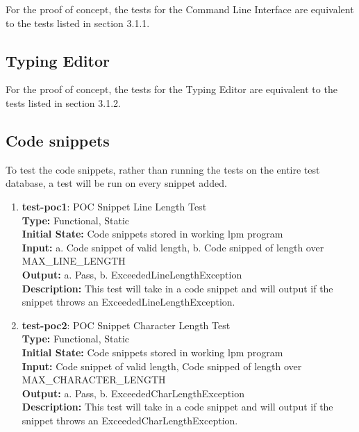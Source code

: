 \documentclass[12pt, titlepage]{article}
\begin{document}
For the proof of concept, the tests for the Command Line Interface are equivalent to the tests listed in section 3.1.1.

\subsection{Typing Editor}

For the proof of concept, the tests for the Typing Editor are equivalent to the tests listed in section 3.1.2.

\subsection{Code snippets}

To test the code snippets, rather than running the tests on the entire test database, a test will be run on every snippet added.

\begin{enumerate}

\item{\textbf{test-poc1}: POC Snippet Line Length Test\\}
\textbf{Type:} Functional, Static \\
\textbf{Initial State:} Code snippets stored in working lpm program\\
\textbf{Input:} a. Code snippet of valid length, b. Code snipped of length over MAX\_LINE\_LENGTH\\
\textbf{Output:} a. Pass, b. ExceededLineLengthException \\
\textbf{Description:} This test will take in a code snippet and will output if the snippet throws an ExceededLineLengthException.\\

\item{\textbf{test-poc2}: POC Snippet Character Length Test\\}
\textbf{Type:} Functional, Static \\
\textbf{Initial State:} Code snippets stored in working lpm program\\
\textbf{Input:} Code snippet of valid length, Code snipped of length over MAX\_CHARACTER\_LENGTH\\
\textbf{Output:} a. Pass, b. ExceededCharLengthException \\
\textbf{Description:} This test will take in a code snippet and will output if the snippet throws an ExceededCharLengthException.\\

\end{enumerate}
\end{document}
